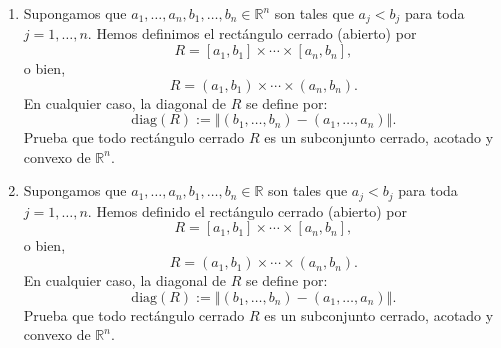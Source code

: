 \documentclass[12pt]{article}
\newcommand{\norm}[1]{\left\Vert#1\right\Vert}
\newcommand{\diag}{\mathrm{diag}}
\newcommand{\Int}{\mathrm{int}}
\newcommand{\R}{\mathbb R}
\newcommand{\x}{\mathrm x}
\begin{document}
\begin{enumerate}
Hemos llegado a una contradicción: por un lado, $\x \in \Int(\Omega)$, y por otro lado, $\x \notin \Int(\Omega)$. Por lo tanto, nuestra suposición inicial de que $\Int(\partial \Omega) \neq \emptyset$ debe ser falsa.

Concluimos que
\[
\Int(\partial \Omega) = \emptyset.
\]

\textbf{Demostración alternativa (más directa):}

Sea $\x \in \partial \Omega$ un punto arbitrario de la frontera. Demostraremos que $\x$ no puede ser un punto interior de $\partial \Omega$.

Por definición de frontera, toda bola abierta centrada en $\x$ contiene tanto puntos de $\Omega$ como puntos de $\R^n \setminus \Omega$.

Supongamos, para buscar una contradicción, que existe $\varepsilon > 0$ tal que $B(\x, \varepsilon) \subseteq \partial \Omega$. Entonces, en particular, $B(\x, \varepsilon) \subseteq \overline{\Omega} = \Omega$ (ya que $\Omega$ es cerrado). Esto significa que $\x \in \Int(\Omega)$.

Pero $\Int(\Omega) \cap \partial \Omega = \emptyset$, ya que $\partial \Omega = \overline{\Omega} \setminus \Int(\Omega)$. Esto contradice que $B(\x, \varepsilon) \subseteq \partial \Omega$ y que $\x \in B(\x, \varepsilon)$.

Por lo tanto, ningún punto de $\partial \Omega$ puede ser un punto interior de $\partial \Omega$, lo que implica que $\Int(\partial \Omega) = \emptyset$.

\item Supongamos que $a_1,\ldots,a_n,b_1,\ldots,b_n\in \R^n$ son tales que $a_j<b_j$ para toda $j=1,\ldots,n$. Hemos definimos el rectángulo cerrado (abierto) por
\[ R = [a_1,b_1]\times \cdots\times [a_n,b_n], \]
o bien,
\[ R = (a_1,b_1)\times \cdots\times (a_n,b_n). \]
En cualquier caso, la \textsf{diagonal} de $R$ se define por:
\[ \diag(R) := \norm{(b_1,\ldots,b_n) - (a_1,\ldots,a_n)}. \]
Prueba que todo rectángulo cerrado $R$ es un subconjunto cerrado, acotado y convexo de $\R^n$. 
\item Supongamos que $a_1,\ldots,a_n,b_1,\ldots,b_n\in \R$ son tales que $a_j<b_j$ para toda $j=1,\ldots,n$. Hemos definido el rectángulo cerrado (abierto) por
\[ R = [a_1,b_1]\times \cdots\times [a_n,b_n], \]
o bien,
\[ R = (a_1,b_1)\times \cdots\times (a_n,b_n). \]
En cualquier caso, la \textsf{diagonal} de $R$ se define por:
\[ \diag(R) := \norm{(b_1,\ldots,b_n) - (a_1,\ldots,a_n)}. \]
Prueba que todo rectángulo cerrado $R$ es un subconjunto cerrado, acotado y convexo de $\R^n$.


\end{enumerate}
\end{document}
